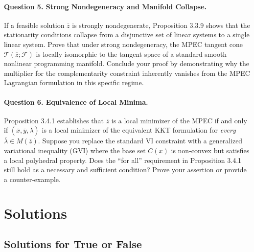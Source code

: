 \documentclass[pdflatex,sn-mathphys-num]{sn-jnl}%
\theoremstyle{definition}
\begin{document}
    \paragraph{Question 5. Strong Nondegeneracy and Manifold Collapse.}
    If a feasible solution $\overline{z}$ is strongly nondegenerate, Proposition 3.3.9 shows that the stationarity conditions collapse from a disjunctive set of linear systems to a single linear system.
    Prove that under strong nondegeneracy, the MPEC tangent cone $\mathcal{T}(\overline{z}; \mathcal{F})$ is locally isomorphic to the tangent space of a standard smooth nonlinear programming manifold. Conclude your proof by demonstrating why the multiplier for the complementarity constraint inherently vanishes from the MPEC Lagrangian formulation in this specific regime.

    \paragraph{Question 6. Equivalence of Local Minima.}
    Proposition 3.4.1 establishes that $\overline{z}$ is a local minimizer of the MPEC if and only if $(\overline{x},\overline{y},\overline{\lambda})$ is a local minimizer of the equivalent KKT formulation for \textit{every} $\overline{\lambda} \in M(\overline{z})$. 
    Suppose you replace the standard VI constraint with a generalized variational inequality (GVI) where the base set $C(x)$ is non-convex but satisfies a local polyhedral property. Does the ``for all'' requirement in Proposition 3.4.1 still hold as a necessary and sufficient condition? Prove your assertion or provide a counter-example.


\section{Solutions}
\subsection{Solutions for True or False}
\end{document}
